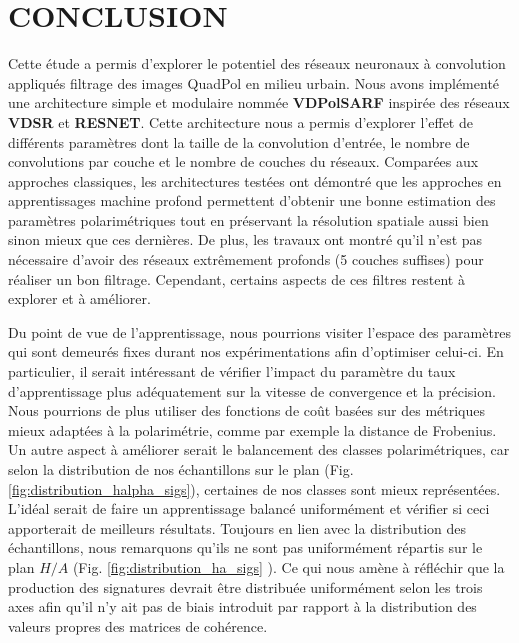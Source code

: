 \chapter{CONCLUSION}

Cette étude a permis d’explorer le potentiel des réseaux neuronaux à convolution appliqués filtrage des images QuadPol en milieu urbain. Nous avons implémenté une architecture simple et modulaire nommée \textbf{VDPolSARF} inspirée des réseaux \textbf{VDSR} et \textbf{RESNET}.  Cette architecture nous a permis d'explorer l'effet de différents paramètres dont la taille de la convolution d'entrée, le nombre de convolutions par couche et le nombre de couches du réseaux. Comparées aux approches classiques, les architectures testées ont démontré que les approches en apprentissages machine profond permettent d'obtenir une bonne estimation des paramètres polarimétriques tout en préservant la résolution spatiale aussi bien sinon mieux que ces dernières. De plus, les travaux ont montré qu'il n'est pas nécessaire d'avoir des réseaux extrêmement profonds (5 couches suffises) pour réaliser un bon filtrage. Cependant, certains aspects de ces filtres restent à explorer et à améliorer.

Du point de vue de l'apprentissage, nous pourrions visiter l'espace des paramètres qui sont demeurés fixes durant nos expérimentations afin d'optimiser celui-ci. En particulier, il serait intéressant de vérifier l'impact du paramètre du taux d'apprentissage plus adéquatement sur la vitesse de convergence et la précision. Nous pourrions de plus utiliser des fonctions de coût basées sur des métriques mieux adaptées à la polarimétrie, comme par exemple la distance de Frobenius. Un autre aspect à améliorer serait le balancement des classes polarimétriques, car selon la distribution de nos échantillons sur le plan {\halphans} (Fig. \ref{fig:distribution_halpha_sigs}), certaines de nos classes sont mieux représentées.  L'idéal serait de faire un apprentissage balancé uniformément et vérifier si ceci apporterait de meilleurs résultats.  Toujours en lien avec la distribution des échantillons, nous remarquons qu'ils ne sont pas uniformément répartis sur le plan $H/A$ (Fig. \ref{fig:distribution_ha_sigs} ).  Ce qui nous amène à réfléchir que la production des signatures devrait être distribuée uniformément selon les trois axes {\haalphans} afin qu'il n'y ait pas de biais introduit par rapport à la distribution des valeurs propres des matrices de cohérence.
 
